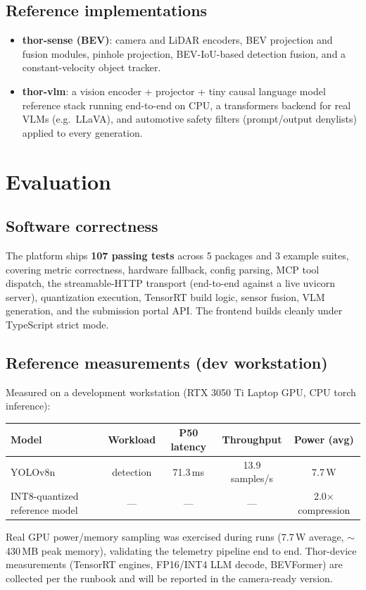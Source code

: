 \documentclass[11pt]{article}
\begin{document}
\subsection{Reference implementations}
\begin{itemize}
  \item \textbf{thor-sense (BEV)}: camera and LiDAR encoders, BEV
        projection and fusion modules, pinhole projection,
        BEV-IoU-based detection fusion, and a constant-velocity
        object tracker.
  \item \textbf{thor-vlm}: a vision encoder + projector + tiny causal
        language model reference stack running end-to-end on CPU, a
        transformers backend for real VLMs (e.g.\ LLaVA), and
        automotive safety filters (prompt/output denylists) applied to
        every generation.
\end{itemize}

\section{Evaluation}
\label{sec:eval}

\subsection{Software correctness}
The platform ships \textbf{107 passing tests} across 5 packages and 3
example suites, covering metric correctness, hardware fallback,
config parsing, MCP tool dispatch, the streamable-HTTP transport
(end-to-end against a live uvicorn server), quantization execution,
TensorRT build logic, sensor fusion, VLM generation, and the
submission portal API. The frontend builds cleanly under TypeScript
strict mode.

\subsection{Reference measurements (dev workstation)}
Measured on a development workstation (RTX 3050 Ti Laptop GPU, CPU
torch inference):
\begin{center}
\begin{tabular}{lcccc}
\toprule
Model & Workload & P50 latency & Throughput & Power (avg) \\
\midrule
YOLOv8n & detection & 71.3\,ms & 13.9 samples/s & 7.7\,W \\
INT8-quantized reference model & --- & --- & --- & 2.0$\times$ compression \\
\bottomrule
\end{tabular}
\end{center}
Real GPU power/memory sampling was exercised during runs
(7.7\,W average, $\sim$430\,MB peak memory), validating the telemetry
pipeline end to end. Thor-device measurements (TensorRT engines,
FP16/INT4 LLM decode, BEVFormer) are collected per the runbook and
will be reported in the camera-ready version.
\end{document}
